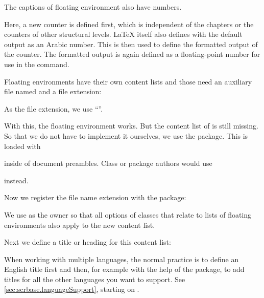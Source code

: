 The captions of floating environment also have numbers.
\begin{lstcode}
  \newcommand*{\remarkboxformat}{%
    Remark~\theremarkbox\csname autodot\endcsname}
  \newcommand*{\fnum@remarkbox}{\remarkboxformat}
\end{lstcode}
Here, a new counter is defined first, which is independent of the chapters
or the counters of other structural levels. \LaTeX{} itself also defines
 with the default output as an Arabic number.
This is then used to define the formatted output of the
counter. The formatted output is again defined as a floating-point
number for use in the  command.

Floating environments have their own content lists
and those need an auxiliary file named  and a file
extension:
\begin{lstcode}
  \newcommand*{\ext@remarkbox}{lor}
\end{lstcode}
As the file extension, we use ``''.

With this, the floating environment works. But the content list of
is still missing. So that we do not have to implement it ourselves, we
use the  package. This is loaded with
\begin{lstcode}
  \usepackage{tocbasic}
\end{lstcode}
inside of document preambles. Class or package authors would use
\begin{lstcode}
  \RequirePackage{tocbasic}
\end{lstcode}
instead.

Now we register the file name extension with the
 package:
\begin{lstcode}
\end{lstcode}
We use  as the owner so that all options of \KOMAScript{}
classes that relate to lists of floating environments also apply to the new
content list.

Next we define a title or heading for this content list:
\begin{lstcode}
  \newcommand*{\listoflorname}{List of Remarks}
\end{lstcode}
When working with multiple languages, the normal practice is to define an
English title first and then, for example with the help of the
 package, to add titles for all the other languages you want
to support. See \autoref{sec:scrbase.languageSupport}, starting on
.

